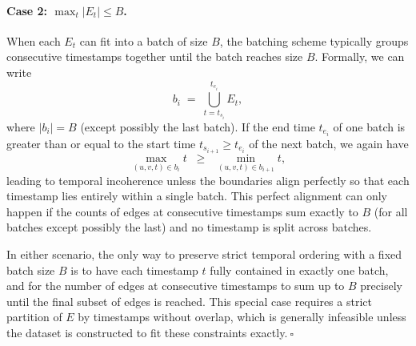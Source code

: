 \paragraph{Case 2: $\max_t |E_t|\le B$.}
When each $E_t$ can fit into a batch of size $B$, the batching scheme typically groups consecutive timestamps together until the batch reaches size $B$. Formally, we can write
$$
b_i \;=\; \bigcup_{t = t_{s_i}}^{t_{e_i}} E_t,
$$
where $|b_i| = B$ (except possibly the last batch). If the end time $t_{e_i}$ of one batch is greater than or equal to the start time $t_{s_{i+1}} \ge t_{e_i}$ of the next batch, we again have
$$
\max_{(u,v,t)\in b_i} t \;\;\ge\;\; \min_{(u,v,t)\in b_{i+1}} t,
$$
leading to temporal incoherence unless the boundaries align perfectly so that each timestamp lies entirely within a single batch. This perfect alignment can only happen if the counts of edges at consecutive timestamps sum exactly to \(B\) (for all batches except possibly the last) and no timestamp is split across batches.

In either scenario, the only way to preserve strict temporal ordering with a fixed batch size $B$ is to have each timestamp $t$ fully contained in exactly one batch, and for the number of edges at consecutive timestamps to sum up to $B$ precisely until the final subset of edges is reached. This special case requires a strict partition of $E$ by timestamps without overlap, which is generally infeasible unless the dataset is constructed to fit these constraints exactly.$~\square$

